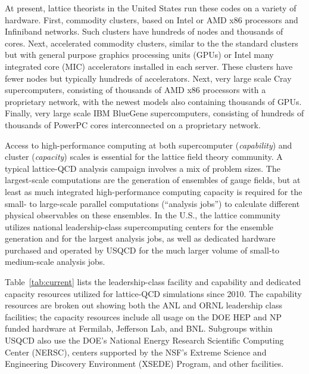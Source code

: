 At present, lattice theorists in the United States run these codes on a
variety of hardware.  First, commodity clusters, based on Intel or AMD x86
processors and Infiniband networks.  Such clusters have hundreds of nodes and
thousands of cores.  Next, accelerated commodity clusters, similar to the the
standard clusters but with general purpose graphics processing units (GPUs) or
Intel many integrated core (MIC) accelerators installed in each server.  These
clusters have fewer nodes but typically hundreds of accelerators.  Next, very
large scale Cray supercomputers, consisting of thousands of AMD x86 processors
with a proprietary network, with the newest models also containing thousands
of GPUs.  Finally, very large scale IBM BlueGene supercomputers, consisting of
hundreds of thousands of PowerPC cores interconnected on a proprietary
network.

Access to high-performance computing at both supercomputer ({\em capability})
and cluster ({\em capacity}) scales is essential for the lattice field theory
community.  A typical lattice-QCD analysis campaign involves a mix of problem
sizes.  The largest-scale computations are the generation of ensembles of
gauge fields, but at least as much integrated high-performance computing
capacity is required for the small- to large-scale parallel computations
(``analysis jobs'') to calculate different physical observables on these
ensembles.  In the U.S., the lattice community utilizes national
leadership-class supercomputing centers for the ensemble generation and for
the largest analysis jobs, as well as dedicated hardware purchased and
operated by USQCD for the much larger volume of small-to medium-scale analysis
jobs.

Table~\ref{tab:current} lists the leadership-class facility and capability and
dedicated capacity resources utilized for lattice-QCD simulations since 2010.
The capability resources are broken out showing both the ANL and ORNL
leadership class facilities; the capacity resources include all usage on the
DOE HEP and NP funded hardware at Fermilab, Jefferson Lab, and BNL.  Subgroups
within USQCD also use the DOE's National Energy Research Scientific Computing
Center (NERSC), centers supported by the NSF's Extreme Science and Engineering
Discovery Environment (XSEDE) Program, and other facilities.

